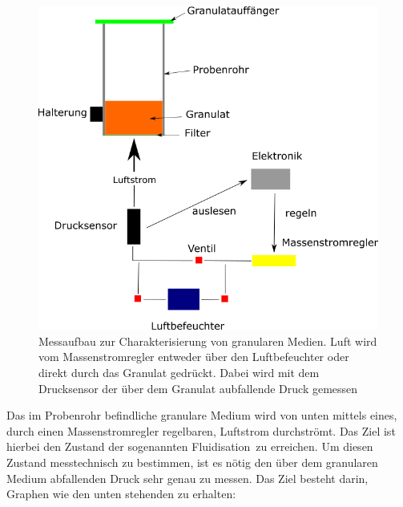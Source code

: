 \begin{figure}[h!]
		\begin{center}
		\includegraphics[scale=0.5]{Prinzip_Wirbelbett.png}
		\caption[Messaufbau Wirbelbett]{Messaufbau zur Charakterisierung von granularen Medien. Luft wird vom Massenstromregler entweder über den Luftbefeuchter oder direkt durch das Granulat gedrückt. Dabei wird mit dem Drucksensor der über dem Granulat aubfallende Druck gemessen}
	\end{center}
\end{figure}	


Das im Probenrohr befindliche granulare Medium wird von unten mittels eines, durch einen Massenstromregler regelbaren, Luftstrom durchströmt. Das Ziel ist hierbei den Zustand der sogenannten \glqq Fluidisation\grqq \ zu erreichen. Um diesen Zustand messtechnisch zu bestimmen, ist es nötig den über dem granularen Medium abfallenden Druck sehr genau zu messen. Das Ziel besteht darin, Graphen wie den unten stehenden zu erhalten:

